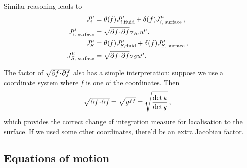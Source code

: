 \documentclass[12pt]{article}
\begin{document}
Similar reasoning leads to
%
\begin{equation}\label{surfcurr:eq}
  \begin{split}
    J^\mu_i &= \theta(f)J^\mu_{i,\text{fluid}} + \delta(f)J^\mu_{i,\text{ surface}}\,,\\
    J^\mu_{i,\text{ surface}} &= \sqrt{\partial f \!\cdot\! \partial f} \sigma_{R_i} u^\mu.\\
    J^\mu_S &= \theta(f)J^\mu_{S,\text{fluid}} + \delta(f)J^\mu_{S,\text{ surface}}\,,\\
    J^\mu_{S,\text{ surface}} &= \sqrt{\partial f \!\cdot\! \partial f} \sigma_{S} u^\mu.
  \end{split}
\end{equation}
%


The factor of $\sqrt{\partial f \!\cdot\! \partial f}$ also has a simple interpretation: suppose we use a coordinate system where $f$ is one of the coordinates. Then
%
\begin{equation}\label{surfmeasure:eq}
  \sqrt{\partial f \!\cdot\! \partial f} = \sqrt{g^{ff}} = \sqrt{\frac{\det h}{\det g}}\,,
\end{equation}
%
which provides the correct change of integration measure for localisation to the surface. If we used some other coordinates, there'd be an extra Jacobian factor.

\subsection{Equations of motion}\label{sec:surfeom}
\end{document}
